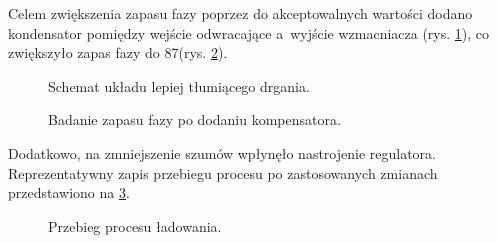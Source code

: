 \documentclass[polish,engineer]{polsl-msth}
\begin{document}
Celem zwiększenia zapasu fazy poprzez do akceptowalnych wartości dodano kondensator pomiędzy wejście odwracające a~wyjście wzmacniacza (rys. \ref{img:HereYouAreMrCap}), co zwiększyło zapas fazy do 87\degree (rys. \ref{img:MrBodeWithCap}).
\begin{figure}[hbtp]
    \centering
     \caption{Schemat układu lepiej tłumiącego drgania. \label{img:HereYouAreMrCap}}
\end{figure}
\begin{figure}[hbtp]
     \caption{Badanie zapasu fazy po dodaniu kompensatora. \label{img:MrBodeWithCap}}
\end{figure}

Dodatkowo, na zmniejszenie szumów wpłynęło nastrojenie regulatora.
Reprezentatywny zapis przebiegu procesu po zastosowanych zmianach przedstawiono na \ref{img:PrettyCharging}.
\begin{figure}[hbtp]
     \caption{Przebieg procesu ładowania. \label{img:PrettyCharging}}
\end{figure}
\end{document}
